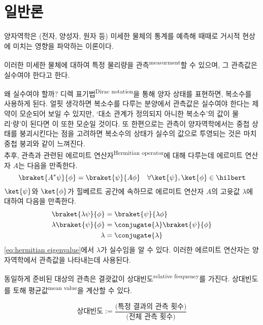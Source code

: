 \documentclass[./note.tex]{subfiles}
\begin{document}
\section{일반론}
\begin{definition}[양자역학]
  양자역학은 (전자, 양성자, 원자 등) 미세한 물체의 통계를 예측해 때때로 거시적 현상에 미치는 영향을 파악하는 이론이다.
\end{definition}
이러한 미세한 물체에 대하여 특정 물리량을 관측\textsuperscript{measurment}할 수 있으며, 그 관측값은 실수여야 한다고 한다.
\begin{note}
  왜 실수여야 할까? 디렉 표기법\textsuperscript{Dirac notation}을 통해 양자 상태를 표현하면, 복소수를 사용하게 된다. 얼핏 생각하면 복소수를 다루는 분양에서 관측값은 실수여야 한다는 제약이 모순되어 보일 수 있지만, `대소 관계가 정의되지 아니한 복소수'의 값이 물리`량'이 된다면 이 또한 모순일 것이다. 또 한편으로는 관측이 양자역학에서는 중첩 상태를 붕괴시킨다는 점을 고려하면 복소수의 상태가 실수의 값으로 투영되는 것은 마치 중첩 붕괴와 같이 느껴진다.\\

  추후, 관측과 관련된 에르미트 연산자\textsuperscript{Hermitian operator}에 대해 다루는데 에르미트 연산자 $A$는 다음을 만족한다.
  \begin{equation}
    \braket{A^*\psi}{\phi} = \braket{\psi}{A\phi} \quad \forall \ket{\psi}, \ket{\phi} \in \hilbert
  \end{equation}
  $\ket{\psi}$와 $\ket{\phi}$가 힐베르트 공간에 속하므로 에르미트 연산자 $A$의 고윳값 $\lambda$에 대하여 다음을 만족한다.
  \begin{align}
    \braket{\lambda\psi}{\phi} &= \braket{\psi}{\lambda\phi} \\
    \lambda\braket{\psi}{\phi} &= \conjugate{\lambda}\braket{\psi}{\phi} \\
    \lambda &= \conjugate{\lambda} \label{eq:hermitian eigenvalue}
  \end{align}
  \eqref{eq:hermitian eigenvalue}에서 $\lambda$가 실수임을 알 수 있다. 이러한 에르미트 연산자는 양자역학에서 관측값을 나타내는데 사용된다.
\end{note}
동일하게 준비된 대상의 관측은 결괏값이 상대빈도\textsuperscript{relative frequency}를 가진다. 상대빈도를 토해 평균값\textsuperscript{mean value}을 계산할 수 있다.
\begin{definition}[상대빈도]
  \begin{equation}
    \text{상대빈도} := \frac{\text{(특정 결과의 관측 횟수)}}{\text{(전체 관측 횟수)}}
  \end{equation}
\end{definition}
\end{document}

